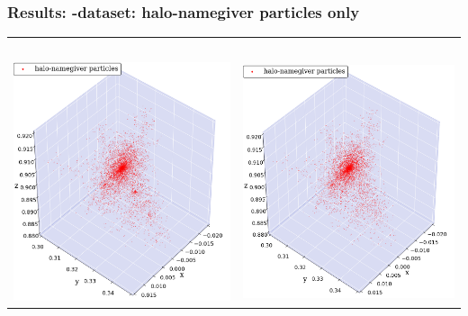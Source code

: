 \begin{frame}
	\frametitle{Results: \cosmo-dataset: halo-namegiver particles only}
	
	\begin{tabular}{c c}
		\neigh\ 	& \iter \\[1.5em]
		{\includegraphics[width = .49\textwidth]{../report/images/cosmo/cos-halo-66858-halo-only-saddle.png}} \hspace*{-1em} 	& 
		{\includegraphics[width = .49\textwidth]{../report/images/cosmo/cos-halo-66858-halo-only-iter.png}}
	\end{tabular}
\end{frame}